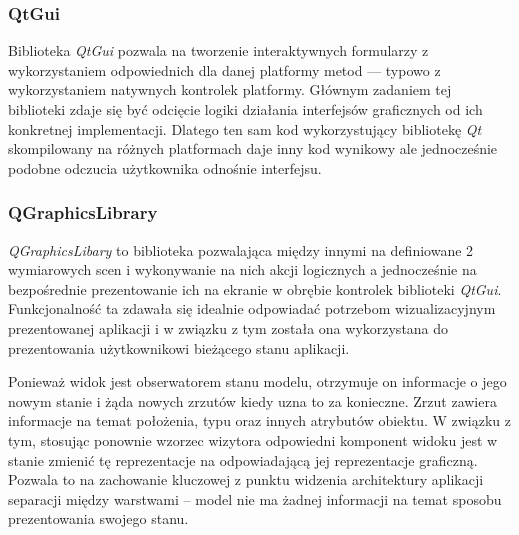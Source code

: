 {{{\subsubsection{QtGui}
\par{
Biblioteka \textit{QtGui} pozwala na tworzenie interaktywnych formularzy z wykorzystaniem odpowiednich dla danej platformy metod --- typowo z wykorzystaniem natywnych kontrolek platformy. Głównym zadaniem tej biblioteki zdaje się być odcięcie logiki działania interfejsów graficznych od ich konkretnej implementacji. Dlatego ten sam kod wykorzystujący bibliotekę \textit{Qt} skompilowany na różnych platformach daje inny kod wynikowy ale jednocześnie podobne odczucia użytkownika odnośnie interfejsu.
}
\subsubsection{QGraphicsLibrary}
\par{
\textit{QGraphicsLibary} to biblioteka pozwalająca między innymi na definiowane 2 wymiarowych scen i wykonywanie na nich akcji logicznych a jednocześnie na bezpośrednie prezentowanie ich na ekranie w obrębie kontrolek biblioteki \textit{QtGui}. Funkcjonalność ta zdawała się idealnie odpowiadać potrzebom wizualizacyjnym prezentowanej aplikacji i w związku z tym została ona wykorzystana do prezentowania użytkownikowi bieżącego stanu aplikacji.
}
\par{
Ponieważ widok jest obserwatorem stanu modelu, otrzymuje on informacje o jego nowym stanie i żąda nowych zrzutów kiedy uzna to za konieczne. Zrzut zawiera informacje na temat położenia, typu oraz innych atrybutów obiektu. W związku z tym, stosując ponownie wzorzec wizytora odpowiedni komponent widoku jest w stanie zmienić tę reprezentacje na odpowiadającą jej reprezentacje graficzną. Pozwala to na zachowanie kluczowej z punktu widzenia architektury aplikacji separacji między warstwami -- model nie ma żadnej informacji na temat sposobu prezentowania swojego stanu.
}

}}}

